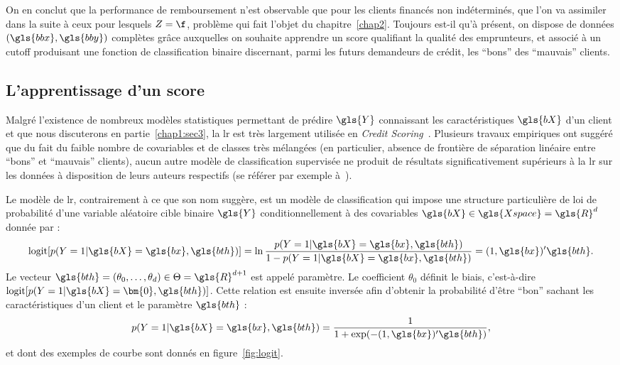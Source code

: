 On en conclut que la performance de remboursement n'est observable que pour les clients financés non indéterminés, que l'on va assimiler dans la suite à ceux pour lesquels $Z=\f$, problème qui fait l'objet du chapitre~\ref{chap2}. Toujours est-il qu'à présent, on dispose de données $(\gls{bbx},\gls{bby})$ complètes grâce auxquelles on souhaite apprendre un \gls{score} qualifiant la qualité des emprunteurs, et associé à un cutoff produisant une fonction de classification binaire discernant, parmi les futurs demandeurs de crédit, les ``bons'' des ``mauvais'' clients.

\subsection{L'apprentissage d'un \gls{score}} \label{subsec:apprentissage}

Malgré l'existence de nombreux modèles statistiques permettant de prédire $\gls{Y}$ connaissant les caractéristiques $\gls{bX}$ d'un client et que nous discuterons en partie~\ref{chap1:sec3}, la \gls{lr} est très largement utilisée en \textit{Credit Scoring}~\cite{thomas2000survey}. Plusieurs travaux empiriques ont suggéré que du fait du faible nombre de covariables et de classes très mélangées (en particulier, absence de frontière de séparation linéaire entre ``bons'' et ``mauvais'' clients), aucun autre modèle de classification supervisée ne produit de résultats significativement supérieurs à la \gls{lr} sur les données à disposition de leurs auteurs respectifs (se référer par exemple à~\cite{hand1997statistical,baesens2003benchmarking,brown2012experimental}).

Le modèle de \gls{lr}, contrairement à ce que son nom suggère, est un modèle de classification qui impose une structure particulière de loi de probabilité d'une variable aléatoire cible binaire $\gls{Y}$ conditionnellement à des covariables $\gls{bX} \in \gls{Xspace}=\gls{R}^d$ donnée par :
\begin{equation} \label{eq:logit}
\text{logit}[p(Y=1 | \gls{bX}=\gls{bx}, \gls{bth})] = \ln \frac{p(Y=1 | \gls{bX}=\gls{bx}, \gls{bth})}{1-p(Y=1 | \gls{bX}=\gls{bx}, \gls{bth})} = (1,\gls{bx})' \gls{bth}.
\end{equation}
Le vecteur $\gls{bth} = (\theta_0,\dots,\theta_d) \in \Theta = \gls{R}^{d+1}$ est appelé paramètre. Le coefficient $\theta_0$ définit le biais, c'est-à-dire $\text{logit}[p(Y=1 | \gls{bX}=\bm{0}, \gls{bth})]$. Cette relation est ensuite inversée afin d'obtenir la probabilité d'être ``bon'' sachant les caractéristiques d'un client et le paramètre $\gls{bth}$ : $$p(Y=1 | \gls{bX}=\gls{bx}, \gls{bth}) = \frac{1}{1+\exp(-(1,\gls{bx})' \gls{bth})},$$ et dont des exemples de courbe sont donnés en figure~\ref{fig:logit}.


